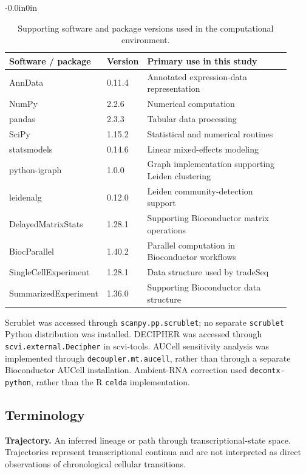 \documentclass[10pt,letterpaper]{article}
\begin{document}
\begin{table}[!ht]
\begin{adjustwidth}{-0.0in}{0in}
\centering
\caption{Supporting software and package versions used in the computational environment.}
\label{tab:software_support}
\begin{tabular}{p{0.23\linewidth} p{0.13\linewidth} p{0.56\linewidth}}
\hline
\textbf{Software / package} & \textbf{Version} & \textbf{Primary use in this study} \\
\hline
AnnData & 0.11.4 & Annotated expression-data representation \\
NumPy & 2.2.6 & Numerical computation \\
pandas & 2.3.3 & Tabular data processing \\
SciPy & 1.15.2 & Statistical and numerical routines \\
statsmodels & 0.14.6 & Linear mixed-effects modeling \\
python-igraph & 1.0.0 & Graph implementation supporting Leiden clustering \\
leidenalg & 0.12.0 & Leiden community-detection support \\
DelayedMatrixStats & 1.28.1 & Supporting Bioconductor matrix operations \\
BiocParallel & 1.40.2 & Parallel computation in Bioconductor workflows \\
SingleCellExperiment & 1.28.1 & Data structure used by tradeSeq \\
SummarizedExperiment & 1.36.0 & Supporting Bioconductor data structure \\
\hline
\end{tabular}
\end{adjustwidth}
\end{table}

Scrublet was accessed through \texttt{scanpy.pp.scrublet}; no separate \texttt{scrublet} Python distribution was installed. DECIPHER was accessed through \texttt{scvi.external.Decipher} in scvi-tools. AUCell sensitivity analysis was implemented through \texttt{decoupler.mt.aucell}, rather than through a separate Bioconductor AUCell installation. Ambient-RNA correction used \texttt{decontx-python}, rather than the R \texttt{celda} implementation.

\subsection*{Terminology}

\textbf{Trajectory.}
An inferred lineage or path through transcriptional-state space. Trajectories represent transcriptional continua and are not interpreted as direct observations of chronological cellular transitions.
\end{document}
